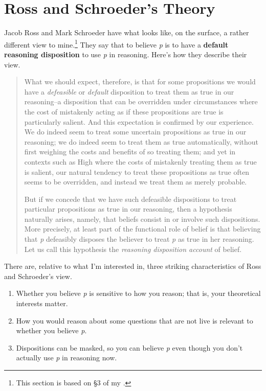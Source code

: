 \documentclass[
  11pt,
]{book}
\providecommand{\tightlist}{%
  \setlength{\itemsep}{0pt}\setlength{\parskip}{0pt}}
\begin{document}
\hypertarget{usc}{%
\section{Ross and Schroeder's Theory}\label{usc}}

Jacob Ross and Mark Schroeder \citeyearpar{RossSchroeder2014} have what looks like, on the surface, a rather different view to mine.\footnote{This section is based on §3 of my \citeyearpar{Weatherson2016}.} They say that to believe \emph{p} is to have a \textbf{default reasoning disposition} to use \emph{p} in reasoning. Here's how they describe their view.

\begin{quote}
What we should expect, therefore, is that for some propositions we would have a \emph{defeasible} or \emph{default} disposition to treat them as true in our reasoning--a disposition that can be overridden under circumstances where the cost of mistakenly acting as if these propositions are true is particularly salient. And this expectation is confirmed by our experience. We do indeed seem to treat some uncertain propositions as true in our reasoning; we do indeed seem to treat them as true automatically, without first weighing the costs and benefits of so treating them; and yet in contexts such as High where the costs of mistakenly treating them as true is salient, our natural tendency to treat these propositions as true often seems to be overridden, and instead we treat them as merely probable.

But if we concede that we have such defeasible dispositions to treat particular propositions as true in our reasoning, then a hypothesis naturally arises, namely, that beliefs consist in or involve such dispositions. More precisely, at least part of the functional role of belief is that believing that \emph{p} defeasibly disposes the believer to treat \emph{p} as true in her reasoning. Let us call this hypothesis the \emph{reasoning disposition account} of belief. \citep[ 9-10]{RossSchroeder2014}
\end{quote}

There are, relative to what I'm interested in, three striking characteristics of Ross and Schroeder's view.

\begin{enumerate}
\def\labelenumi{\arabic{enumi}.}
\tightlist
\item
  Whether you believe \emph{p} is sensitive to how you reason; that is, your theoretical interests matter.
\item
  How you would reason about some questions that are not live is relevant to whether you believe \emph{p}.
\item
  Dispositions can be masked, so you can believe \emph{p} even though you don't actually use \emph{p} in reasoning now.
\end{enumerate}
\end{document}
